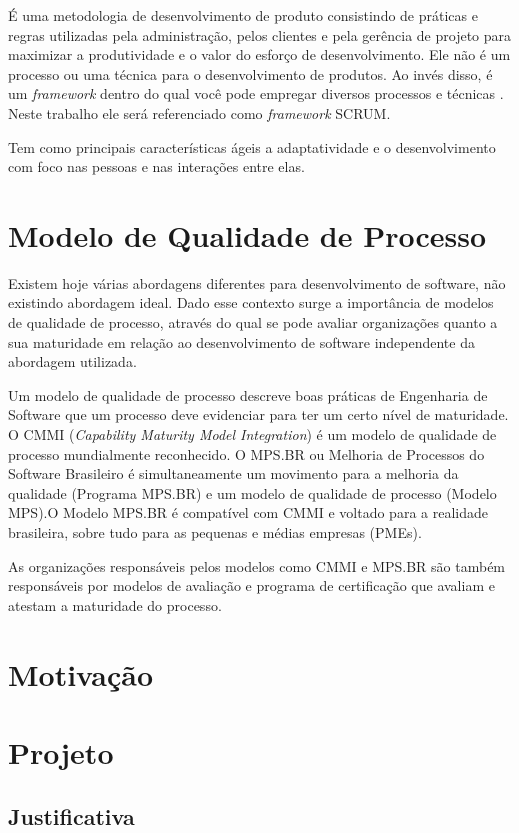 É uma metodologia de desenvolvimento de produto consistindo de práticas e regras utilizadas pela administração, pelos clientes e pela gerência de projeto para maximizar a produtividade e o valor do esforço de desenvolvimento. Ele não é um processo ou uma técnica para o desenvolvimento de produtos. Ao invés disso, é um \emph{framework} dentro do qual você pode empregar diversos processos e técnicas  \cite{Schwaber2002}. Neste trabalho ele será referenciado como \emph{framework} SCRUM.

Tem como principais características ágeis a adaptatividade e o desenvolvimento com foco nas pessoas e nas interações entre elas.

\section{Modelo de Qualidade de Processo}

Existem hoje várias abordagens diferentes para desenvolvimento de software, não existindo abordagem ideal. Dado esse contexto surge a importância de modelos de qualidade de processo, através do qual se pode avaliar organizações quanto a sua maturidade em relação ao desenvolvimento de software independente da abordagem utilizada.

Um modelo de qualidade de processo descreve boas práticas de Engenharia de Software que um processo deve evidenciar para ter um certo nível de maturidade. O CMMI (\emph{Capability Maturity Model Integration}) é um modelo de qualidade de processo mundialmente reconhecido. O MPS.BR ou Melhoria de Processos do Software Brasileiro é simultaneamente um movimento para a melhoria da qualidade (Programa MPS.BR) e um modelo de qualidade de processo (Modelo MPS).O Modelo MPS.BR é compatível com CMMI e voltado para a realidade brasileira, sobre tudo para as pequenas e médias empresas (PMEs).

As organizações responsáveis pelos modelos como CMMI e MPS.BR são também responsáveis por modelos de avaliação e programa de certificação que avaliam e atestam a maturidade do processo.

\section{Motivação}


\section{Projeto}
\subsection{Justificativa}
